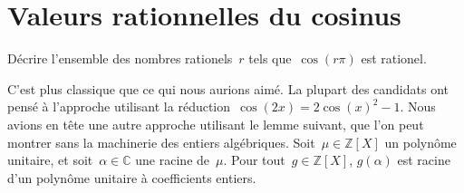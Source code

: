\section{Valeurs rationnelles du cosinus}

Décrire l'ensemble des nombres rationels~$r$ tels que~$\cos(r \pi)$ est rationel.

\begin{em}
  C'est plus classique que ce qui nous aurions aimé.
  La plupart des candidats ont pensé à l'approche utilisant la réduction~$\cos(2x) = 2\cos(x)^2 - 1$.
  Nous avions en tête une autre approche utilisant le lemme suivant, que l'on peut montrer sans la machinerie des entiers algébriques.
  Soit~$\mu \in \mathbb{Z}[X]$ un polynôme unitaire, et soit~$\alpha\in \mathbb{C}$ une racine de~$\mu$.
  Pour tout~$g\in \mathbb{Z}[X]$, $g(\alpha)$ est racine d'un polynôme unitaire à coefficients entiers.
\end{em}

